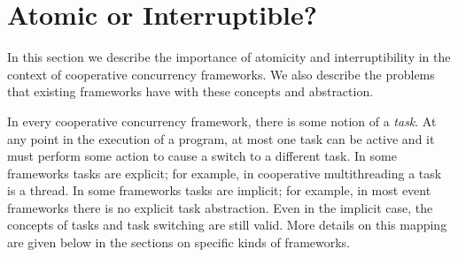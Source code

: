 \documentclass[9pt,preprint]{sigplanconf}
\begin{document}




\section{Atomic or Interruptible?}

In this section we describe the importance of atomicity and interruptibility in the context of cooperative concurrency frameworks.
We also describe the problems that existing frameworks have with these concepts and abstraction.

In every cooperative concurrency framework, there is some notion of a \emph{task}.
At any point in the execution of a program, at most one task can be active and it must perform some action to cause a switch to a different task.
In some frameworks tasks are explicit; for example, in cooperative multithreading a task is a thread.
In some frameworks tasks are implicit; for example, in most event frameworks there is no explicit task abstraction.
Even in the implicit case, the concepts of tasks and task switching are still valid.
More details on this mapping are given below in the sections on specific kinds of frameworks.
\end{document}
